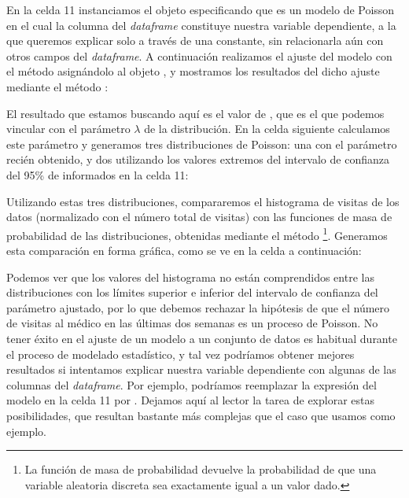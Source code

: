 
En la celda 11 instanciamos el objeto  especificando que es un modelo de Poisson en el cual la columna  del \textit{dataframe} constituye nuestra variable dependiente, a la que queremos explicar solo a través de una constante, sin relacionarla aún con otros campos del \textit{dataframe}. A continuación realizamos el ajuste del modelo con el método  asignándolo al objeto , y mostramos los resultados del dicho ajuste mediante el método :


El resultado que estamos buscando aquí es el valor de , que es el que podemos vincular con el parámetro $\lambda$ de la distribución. En la celda siguiente calculamos este parámetro y generamos tres distribuciones de Poisson: una con el parámetro recién obtenido, y dos utilizando los valores extremos del intervalo de confianza del 95\% de  informados en la celda 11:


Utilizando estas tres distribuciones, compararemos el histograma de visitas de los datos (normalizado con el número total de visitas) con las funciones de masa de probabilidad de las distribuciones, obtenidas mediante el método \footnote{La función de masa de probabilidad devuelve la probabilidad de que una variable aleatoria discreta sea exactamente igual a un valor dado.}. Generamos esta comparación en forma gráfica, como se ve en la celda a continuación:


Podemos ver que los valores del histograma no están comprendidos entre las distribuciones con los límites superior e inferior del intervalo de confianza del parámetro ajustado, por lo que debemos rechazar la hipótesis de que el número de visitas al médico en las últimas dos semanas es un proceso de Poisson. No tener éxito en el ajuste de un modelo a un conjunto de datos es habitual durante el proceso de modelado estadístico, y tal vez podríamos obtener mejores resultados si intentamos explicar nuestra variable dependiente con algunas de las columnas del \textit{dataframe}. Por ejemplo, podríamos reemplazar la expresión del modelo en la celda 11 por . Dejamos aquí al lector la tarea de explorar estas posibilidades, que resultan bastante más complejas que el caso que usamos como ejemplo.
  
